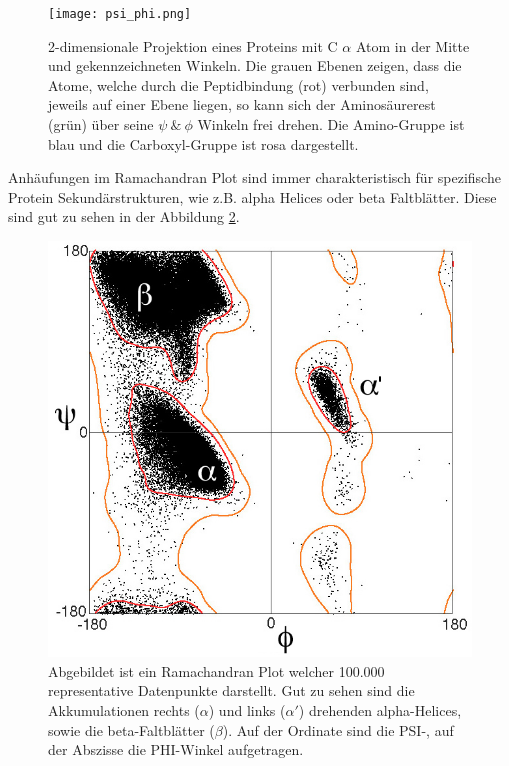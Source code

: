 \begin{figure}
    \texttt{[image: psi\_phi.png]}
    \caption{2-dimensionale Projektion eines Proteins mit C $\alpha$ Atom in der Mitte und gekennzeichneten Winkeln. Die grauen Ebenen zeigen, dass die Atome, welche durch die Peptidbindung (rot) verbunden sind, jeweils auf einer Ebene liegen, so kann sich der Aminosäurerest (grün) über seine $\psi\ \&\ \phi$ Winkeln frei drehen. Die Amino-Gruppe ist blau und die Carboxyl-Gruppe ist rosa dargestellt.\protect\footnotemark}
    \label{fig:psi_phi}
\end{figure}

Anhäufungen im Ramachandran Plot sind immer charakteristisch für spezifische Protein Sekundärstrukturen, wie z.B. alpha Helices oder beta Faltblätter. Diese sind gut zu sehen in der Abbildung \ref{fig:ramaplot}.

\begin{figure}
\includegraphics[width=.95\textwidth]{images/Ramaplot.png}
\caption{Abgebildet ist ein Ramachandran Plot welcher 100.000 representative Datenpunkte darstellt. Gut zu sehen sind die Akkumulationen rechts ($\alpha$) und links ($\alpha'$) drehenden alpha-Helices, sowie die beta-Faltblätter ($\beta$). Auf der Ordinate sind die PSI-, auf der Abszisse die PHI-Winkel aufgetragen\protect\footnotemark.}
\label{fig:ramaplot}
\end{figure}

